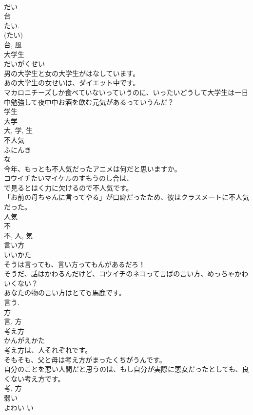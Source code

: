 \documentclass[8pt]{extreport}
\begin{document}
\begin{CJK}{UTF8}{min}
\\	だい 
\\	台 
\\	たい. 
\\	(たい) 
\\	台, 風	
\\	大学生	
\\	だいがくせい	
\\	男の大学生と女の大学生がはなしています。	
\\	あの大学生の女せいは、ダイエット中です。	
\\	マカロニチーズしか食べていないっていうのに、いったいどうして大学生は一日中勉強して夜中中お酒を飲む元気があるっていうんだ？	
\\	学生 
\\	大学 
\\	大, 学, 生	
\\	不人気	
\\	ふにんき	
\\	な 
\\	今年、もっとも不人気だったアニメは何だと思いますか。	
\\	コウイチたいマイケルのすもうのし合は、
\\	で見るとはく力に欠けるので不人気です。	
\\	「お前の母ちゃんに言ってやる」が口癖だったため、彼はクラスメートに不人気だった。	
\\	人気 
\\	不 
\\	不, 人, 気	
\\	言い方	
\\	いいかた	
\\	そうは言っても、言い方ってもんがあるだろ！	
\\	そうだ、話はかわるんだけど、コウイチのネコって言ばの言い方、めっちゃかわいくない？	
\\	あなたの物の言い方はとても馬鹿です。	
\\	言う. 
\\	方 
\\	言, 方	
\\	考え方	
\\	かんがえかた	
\\	考え方は、人それぞれです。	
\\	そもそも、父と母は考え方がまったくちがうんです。	
\\	自分のことを悪い人間だと思うのは、もし自分が実際に悪女だったとしても、良くない考え方です。	
\\	考, 方	
\\	弱い	
\\	よわい	い 

\end{CJK}
\end{document}

